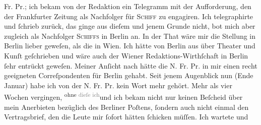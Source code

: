 \begin{ledgroupsized}[t]{13cm}
                  Fr. Pr.; ich bekam von der Redaktion ein Telegramm mit der Aufforderung, den \label{K_L02868-8v}\label{K_L02868-8h} der Frankfurter Zeitung als Nachfolger für \textsc{Schiff} zu engagiren. {\pb}Ich telegraphirte \introOben{}und ſchrieb\introOben{} zurück, das ginge aus dieſem und jenem Grunde
               nicht, bot mich aber zugleich als Nachfolger \textsc{Schiffs} in Berlin an. In der That wäre mir die Stellung in Berlin lieber geweſen,  als die in Wien. Ich hätte von
                  Berlin aus über Theater und Kunſt geſchrieben
               und wäre auch der Wiener Redaktions-Wirthſchaft in
                  Berlin ſehr  entrückt geweſen. Meiner Anſicht nach hätte
               die N. Fr. Pr. in mir einen recht geeigneten
               Correſpondenten für Berlin gehabt. Seit jenem
               Augenblick nun (Ende Januar) habe ich  von der N. Fr.
                  Pr. kein Wort mehr gehört. Mehr als vier Wochen vergingen, \substVorne{}\textsuperscript{ohne{ }\textcolor{gray}{dieſe ich}}{\allowbreak}\substDazwischen{}und ich bekam\substHinten{} nicht nur keinen Beſcheid über mein Anerbieten bezüglich des Berliner Poſtens, ſondern auch nicht einmal den
               Vertragsbrief, den die Leute mir ſofort hätten ſchicken müſſen. Ich wartete und

\end{ledgroupsized}
